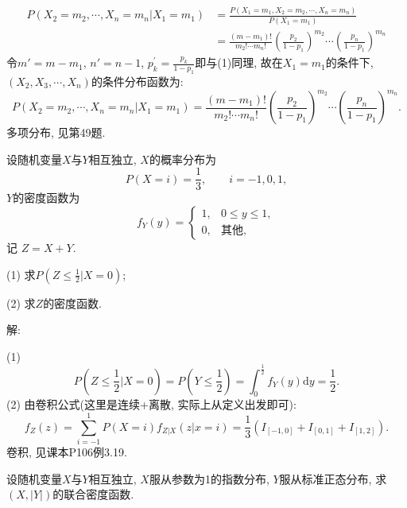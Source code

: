 \documentclass[standard]{ExBook}
\renewenvironment{shaded}{%
  \def\FrameCommand{\fboxsep=\FrameSep \colorbox{shadecolor}}%
  \MakeFramed{\advance\hsize-\width \FrameRestore}%
}{%
  \endMakeFramed
}
\begin{document}
\begin{qitems}
$$
\begin{aligned}
P(X_2=m_2,\cdots,X_n=m_n|X_1=m_1)
&=\frac{P(X_1=m_1,X_2=m_2,\cdots,X_n=m_n)}{P(X_1=m_1)}\\
&=\frac{(m-m_1)!}{m_2!\cdots m_n!}\left(\frac{p_2}{1-p_1}\right)^{m_2}\cdots\left(\frac{p_n}{1-p_1}\right)^{m_n}
\end{aligned}
$$
 令$m'=m-m_1$, $n'=n-1$, $p_k^{'}=\frac{p_k}{1-p_1}$即与(1)同理, 故在$X_1=m_1$的条件下, $(X_2,X_3,\cdots,X_n)$的条件分布函数为:
$$P(X_2=m_2,\cdots,X_n=m_n|X_1=m_1)=\frac{(m-m_1)!}{m_2!\cdots m_n!}\left(\frac{p_2}{1-p_1}\right)^{m_2}\cdots\left(\frac{p_n}{1-p_1}\right)^{m_n}.$$
\textcolor{themeColor}{\selectfont {} 多项分布, 见第49题.}

\vspace{2.5cm-5em}

    \begin{bbox}
    \begin{shaded}
        \qitem
设随机变量$X$与$Y$相互独立, $X$的概率分布为
\[
P(X=i)=\frac{1}{3},\qquad i=-1,0,1,
\]
$Y$的密度函数为
\[
f_{Y}(y)=
\left\{
\begin{array}{ll}
    1, & 0\leq y\leq 1,\\
    0, & \text{其他},
\end{array}
\right.
\]
记 $Z = X + Y$.

(1) 求$P(Z\leq \displaystyle\frac{1}{2}|X=0)$;

(2) 求$Z$的密度函数.
    \end{shaded}
    \end{bbox}

\vspace{\dimexpr2.5cm-5em\relax}

解: 

(1)
$$P(Z\leq \displaystyle\frac{1}{2}|X=0)=P(Y\leq \frac{1}{2})=\int_{0}^{\frac{1}{2}}f_{Y}(y)\mathrm{d}y=\frac{1}{2}.$$
(2) 由卷积公式(这里是连续+离散, 实际上从定义出发即可):
$$f_{Z}(z)=\sum\limits_{i=-1}^{1}P(X=i)f_{Z|X}(z|x=i)=\frac{1}{3}(I_{[-1,0]}+I_{[0,1]}+I_{[1,2]}).$$
\textcolor{themeColor}{\selectfont {} 卷积, 见课本P106例3.19.}

\vspace{2.5cm-5em}

    \begin{bbox}
    \begin{shaded}
        \qitem
设随机变量$X$与$Y$相互独立, $X$服从参数为1的指数分布, $Y$服从标准正态分布, 求$(X,|Y|)$的联合密度函数.
    \end{shaded}
    \end{bbox}


\end{qitems}
\end{document}
